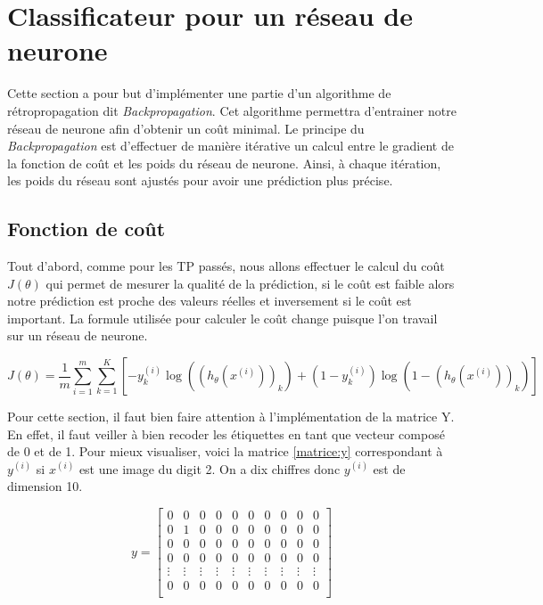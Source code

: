 \section{Classificateur pour un réseau de neurone}

Cette section a pour but d'implémenter une partie d'un algorithme de rétropropagation dit 
\textit{Backpropagation}. Cet algorithme permettra d'entrainer notre réseau de neurone afin d'obtenir
un coût minimal. Le principe du \textit{Backpropagation} est d'effectuer de manière itérative un calcul
entre le gradient de la fonction de coût et les poids du réseau de neurone. Ainsi, à chaque itération, les
poids du réseau sont ajustés pour avoir une prédiction plus précise. 

\subsection{Fonction de coût}

Tout d'abord, comme pour les TP passés, nous allons effectuer le calcul du coût $J(\theta)$ qui
permet de mesurer la qualité de la prédiction, si le coût est faible alors notre prédiction est proche 
des valeurs réelles et inversement si le coût est important. La formule utilisée 
pour calculer le coût change puisque l'on travail sur un réseau de neurone. 

\begin{equation}
    J(\theta) = \frac{1}{m} \sum_{i=1}^{m} \sum_{k=1}^{K} \left[ -y_k^{(i)} \log((h_\theta(x^{(i)}))_{k}) + (1 - y_k^{(i)}) \log(1 - (h_\theta(x^{(i)}))_{k}) \right]
\end{equation}

Pour cette section, il faut bien faire attention à l'implémentation de la matrice Y. En effet, il faut
veiller à bien recoder les étiquettes en tant que vecteur composé de 0 et de 1. Pour mieux visualiser,
voici la matrice \ref{matrice:y} correspondant à $y^{(i)}$ si $x^{(i)}$ est une image du digit 2. On a dix chiffres donc 
$y^{(i)}$ est de dimension 10. 


\[ y = \begin{bmatrix}\label{matrice:y}
    0 & 0 & 0 & 0 & 0 & 0 & 0 & 0 & 0 & 0\\
    0 & 1 & 0 & 0 & 0 & 0 & 0 & 0 & 0 & 0\\
    0 & 0 & 0 & 0 & 0 & 0 & 0 & 0 & 0 & 0\\
    0 & 0 & 0 & 0 & 0 & 0 & 0 & 0 & 0 & 0\\
    \vdots & \vdots & \vdots & \vdots & \vdots & \vdots & \vdots & \vdots & \vdots & \vdots \\
    0 & 0 & 0 & 0 & 0 & 0 & 0 & 0 & 0 & 0\\
    \end{bmatrix} \]

